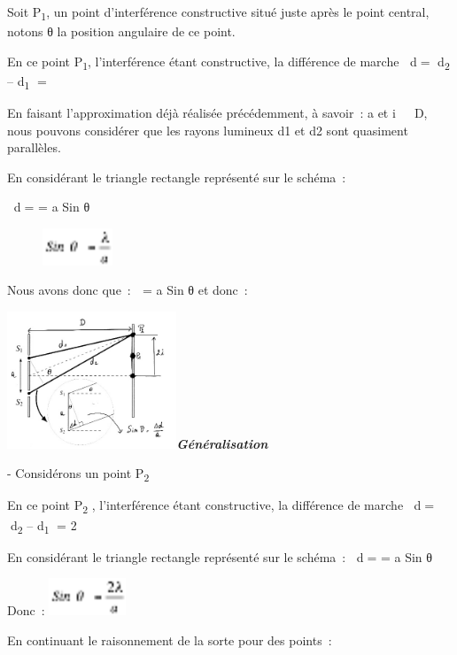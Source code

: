 Soit P\textsubscript{1}, un point d'interférence constructive situé
juste après le point central, notons θ la position angulaire de ce
point.

En ce point P\textsubscript{1}, l'interférence étant constructive, la
différence de marche d= d\textsubscript{2} -- d\textsubscript{1} =


En faisant l'approximation déjà réalisée précédemment, à savoir~: a et i
 D, nous pouvons considérer que les rayons lumineux d1 et d2 sont
quasiment parallèles.

En considérant le triangle rectangle représenté sur le schéma~:

d= = a Sin θ

\begin{figure}
\centering
\includegraphics[width=2.095cm,height=1.107cm]{Pictures/100000010000002800000015DDF3AE193165C3E3.png}
\caption{}
\end{figure}

Nous avons donc que~:  = a Sin θ et donc~:

\includegraphics[width=5.061cm,height=4.096cm]{Pictures/10000001000001D80000017E98931F1CF545D918.png}\emph{\textbf{Généralisation
}}

- Considérons un point P\textsubscript{2}

En ce point P\textsubscript{2 }, l'interférence étant constructive, la
différence de marche d= d\textsubscript{2} -- d\textsubscript{1} =
2

En considérant le triangle rectangle représenté sur le schéma~: d= =
a Sin θ

Donc~:
\includegraphics[width=2.306cm,height=1.107cm]{Pictures/100000010000002C000000153ADDDC592928E9B8.png}

En continuant le raisonnement de la sorte pour des points~:

